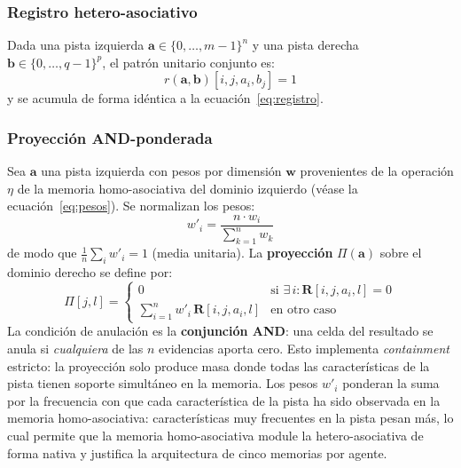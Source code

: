 \subsubsection*{Registro hetero-asociativo}

Dada una pista izquierda $\mathbf{a} \in \{0,\ldots,m-1\}^n$ y una pista derecha
$\mathbf{b} \in \{0,\ldots,q-1\}^p$, el patrón unitario conjunto es:
\begin{equation}
    r(\mathbf{a}, \mathbf{b})[i, j, a_i, b_j] = 1
    \label{eq:registro-hetero}
\end{equation}
y se acumula de forma idéntica a la ecuación~\eqref{eq:registro}.

\subsubsection*{Proyección AND-ponderada}

Sea $\mathbf{a}$ una pista izquierda con pesos por dimensión $\mathbf{w}$ provenientes de
la operación $\eta$ de la memoria homo-asociativa del dominio izquierdo
(véase la ecuación~\eqref{eq:pesos}).
Se normalizan los pesos:
\begin{equation}
    w'_i = \frac{n \cdot w_i}{\displaystyle\sum_{k=1}^{n} w_k}
    \label{eq:normalizacion-pesos}
\end{equation}
de modo que $\frac{1}{n}\sum_i w'_i = 1$ (media unitaria).
La \textbf{proyección} $\Pi(\mathbf{a})$ sobre el dominio derecho se define por:
\begin{equation}
    \Pi[j, l] = \begin{cases}
        0 & \text{si } \exists\, i : \mathbf{R}[i, j, a_i, l] = 0 \\[4pt]
        \displaystyle\sum_{i=1}^{n} w'_i\, \mathbf{R}[i, j, a_i, l] & \text{en otro caso}
    \end{cases}
    \label{eq:proyeccion-AND}
\end{equation}
La condición de anulación es la \textbf{conjunción AND}: una celda del resultado se
anula si \emph{cualquiera} de las $n$ evidencias aporta cero.
Esto implementa \emph{containment} estricto: la proyección solo produce masa donde
todas las características de la pista tienen soporte simultáneo en la memoria.
Los pesos $w'_i$ ponderan la suma por la frecuencia con que cada característica de la pista
ha sido observada en la memoria homo-asociativa: características muy frecuentes en la pista
pesan más, lo cual permite que la memoria homo-asociativa module la hetero-asociativa
de forma nativa y justifica la arquitectura de cinco memorias por agente.

